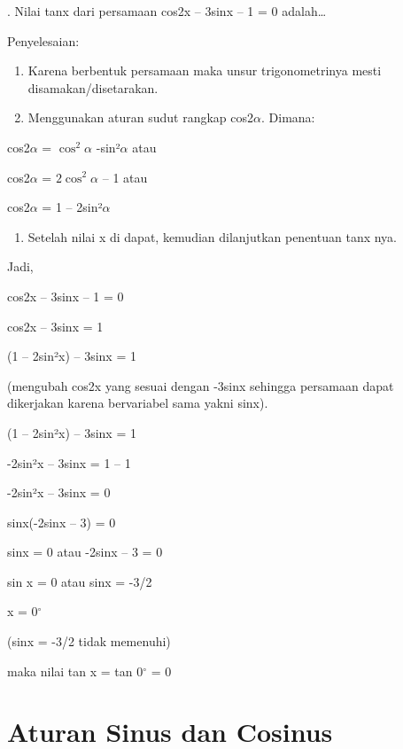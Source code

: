 \documentclass[11pt,fleqn]{book} %
\begin{document}
. Nilai tanx dari persamaan cos2x -- 3sinx -- 1 = 0 adalah{\dots}

\noindent Penyelesaian:

\begin{enumerate}
\item  Karena berbentuk persamaan maka unsur trigonometrinya mesti disamakan/disetarakan.

\item  Menggunakan aturan sudut rangkap cos2$\alpha$. Dimana:
\end{enumerate}

\noindent cos2$\alpha$ = $\cos^2\alpha$ -sin²$\alpha$ atau

\noindent cos2$\alpha$ = $2\cos^2\alpha$ -- 1 atau

\noindent cos2$\alpha$ = 1 -- 2sin²$\alpha$

\begin{enumerate}
\item  Setelah nilai x di dapat, kemudian dilanjutkan penentuan tanx nya.
\end{enumerate}

\noindent Jadi,

\noindent cos2x -- 3sinx -- 1 = 0

\noindent cos2x -- 3sinx = 1

\noindent (1 -- 2sin²x) -- 3sinx = 1

\noindent (mengubah cos2x yang sesuai dengan -3sinx sehingga persamaan dapat dikerjakan karena bervariabel sama yakni sinx).

\noindent (1 -- 2sin²x) -- 3sinx = 1

\noindent -2sin²x -- 3sinx = 1 -- 1

\noindent -2sin²x -- 3sinx = 0

\noindent sinx(-2sinx -- 3) = 0

\noindent sinx = 0 atau -2sinx -- 3 = 0

\noindent sin x = 0 atau sinx = -3/2

\noindent x = 0${}^\circ$

\noindent (sinx = -3/2 tidak memenuhi)

\noindent maka nilai tan x = tan 0${}^\circ$ = 0

\noindent 

\noindent \textbf{}

\noindent 

\section{Aturan Sinus dan Cosinus}
\end{document}
